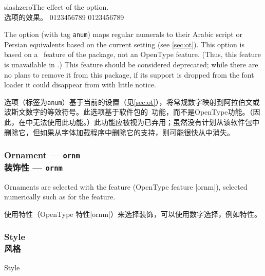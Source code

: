 \documentclass[a4paper]{l3doc}
\begin{document}
\begin{Lexample}{slashzero}{The effect of the  option.\\ 选项的效果。}
   0123456789
   0123456789
\end{Lexample}

The  option (with tag \verb|anum|) maps regular numerals to their Arabic script or Persian equivalents
based on the current  setting (see \vref{sec:ot}).
This option is based on a \LuaTeX\ feature of the  package,
not an OpenType feature. (Thus, this feature is unavailable in \XeTeX.)
This feature should be considered deprecated; while there are no plans to remove it from this package,
if its support is dropped from the font loader it could disappear from  with little notice.

选项（标签为\verb|anum|）基于当前的设置（见\vref{sec:ot}），将常规数字映射到阿拉伯文或波斯文数字的等效符号。此选项基于软件包的\LuaTeX\ 功能，而不是OpenType功能。（因此，在\XeTeX 中无法使用此功能。）此功能应被视为已弃用；虽然没有计划从该软件包中删除它，但如果从字体加载程序中删除它的支持，则可能很快从中消失。

\subsubsection{Ornament --- \texttt{ornm}\\装饰性 --- \texttt{ornm}}

Ornaments are selected with the  feature (OpenType feature |ornm|),
selected numerically such as for the  feature.

使用特性（OpenType 特性|ornm|）来选择装饰，可以使用数字选择，例如特性。

\subsubsection{Style\\风格}
\label{sec:ot-feat-style}

\begin{features}{Style}
\end{features}
\end{document}

